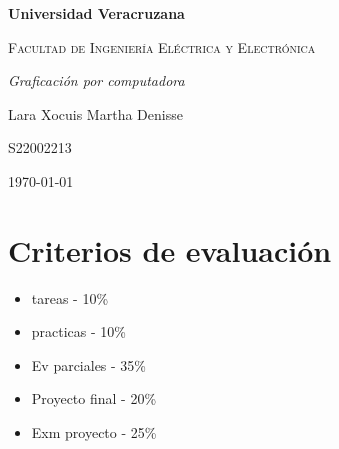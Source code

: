 \documentclass[letterpaper,12pt]{article}
\begin{document}
\thispagestyle{empty}
\newpage
\setcounter{page}{1}
\pagestyle{headings}
\begin{sloppypar} 
    \begin{titlepage}
        \hspace{2.5cm}
        {\bfseries\LARGE Universidad Veracruzana \par}
        \hspace{2cm}
        {\scshape\Large Facultad de Ingeniería Eléctrica y Electrónica \par}
        \begin{center}
            \vspace{7cm}
            {\itshape\huge Graficación por computadora \par}
            {\large Lara Xocuis Martha Denisse\par}
            {\large S22002213 \par}
            \vfill
            {\Large \today \par}
        \end{center}
    \end{titlepage} 

\section{Criterios de evaluación}
\begin{itemize}
    \item tareas - 10\%
    \item practicas - 10\%
    \item Ev parciales - 35\%
    \item Proyecto final - 20\%
    \item Exm proyecto - 25\%
\end{itemize}


\end{sloppypar}
\end{document}
